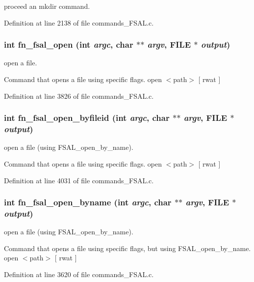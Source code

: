 proceed an mkdir command. 

Definition at line 2138 of file commands\_\-FSAL.c.
\subsubsection[{fn\_\-fsal\_\-open}]{\setlength{\rightskip}{0pt plus 5cm}int fn\_\-fsal\_\-open (int {\em argc}, \/  char $\ast$$\ast$ {\em argv}, \/  FILE $\ast$ {\em output})}\label{commands_8h_a7eb0d8c88e206ec8f0a2c3bc7b8586b5}
open a file.

Command that opens a file using specific flags. open $<$path$>$ [ rwat ] 

Definition at line 3826 of file commands\_\-FSAL.c.
\subsubsection[{fn\_\-fsal\_\-open\_\-byfileid}]{\setlength{\rightskip}{0pt plus 5cm}int fn\_\-fsal\_\-open\_\-byfileid (int {\em argc}, \/  char $\ast$$\ast$ {\em argv}, \/  FILE $\ast$ {\em output})}\label{commands_8h_a2d40d85e39ad21317aee36aa87be48d0}
open a file (using FSAL\_\-open\_\-by\_\-name).

Command that opens a file using specific flags. open $<$path$>$ [ rwat ] 

Definition at line 4031 of file commands\_\-FSAL.c.
\subsubsection[{fn\_\-fsal\_\-open\_\-byname}]{\setlength{\rightskip}{0pt plus 5cm}int fn\_\-fsal\_\-open\_\-byname (int {\em argc}, \/  char $\ast$$\ast$ {\em argv}, \/  FILE $\ast$ {\em output})}\label{commands_8h_aa74f1d4efec11e55723d0ac4eaf7856e}
open a file (using FSAL\_\-open\_\-by\_\-name).

Command that opens a file using specific flags, but using FSAL\_\-open\_\-by\_\-name. open $<$path$>$ [ rwat ] 

Definition at line 3620 of file commands\_\-FSAL.c.
